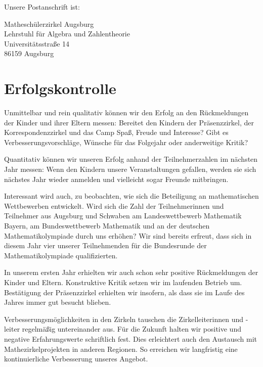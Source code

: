 \documentclass[12pt]{zettel}
\begin{document}
Unsere Postanschrift ist:
\vspace{-0.5em}
\begin{tabbing}
  {\qquad} Matheschülerzirkel Augsburg \\
  {\qquad} Lehrstuhl für Algebra und Zahlentheorie \\
  {\qquad} Universitätsstraße 14 \\
  {\qquad} 86159 Augsburg
\end{tabbing}


\section{Erfolgskontrolle}

Unmittelbar und rein qualitativ können wir den Erfolg an den Rückmeldungen der
Kinder und ihrer Eltern messen: Bereitet den Kindern der Präsenzzirkel, der
Korrespondenzzirkel und das Camp Spaß, Freude und Interesse? Gibt es
Verbesserungsvorschläge, Wünsche für das Folgejahr oder anderweitige Kritik?

Quantitativ können wir unseren Erfolg anhand der Teilnehmerzahlen im nächsten
Jahr messen: Wenn den Kindern unsere Veranstaltungen gefallen, werden sie sich
nächstes Jahr wieder anmelden und vielleicht sogar Freunde mitbringen.

Interessant wird auch, zu beobachten, wie sich die Beteiligung an
mathematischen Wettbewerben entwickelt. Wird sich die Zahl der
Teilnehmerinnen und Teilnehmer aus Augsburg und Schwaben am Landeswettbewerb
Mathematik Bayern, am Bundeswettbewerb Mathematik und an der deutschen
Mathematikolympiade durch uns erhöhen? Wir sind bereits erfreut,
dass sich in diesem Jahr vier unserer Teilnehmenden für die
Bundesrunde der Mathematikolympiade qualifizierten.

In unserem ersten Jahr erhielten wir auch schon sehr positive Rückmeldungen der
Kinder und Eltern. Konstruktive Kritik setzen wir im laufenden Betrieb um. Bestätigung der Präsenzzirkel erhielten wir insofern, als dass sie im Laufe des Jahres immer gut besucht blieben.

Verbesserungsmöglichkeiten in den Zirkeln tauschen die Zirkelleiterinnen und -leiter regelmäßig untereinander aus. Für die Zukunft halten wir positive und negative Erfahrungswerte schriftlich fest. Dies erleichtert auch den Austausch mit Mathezirkelprojekten in anderen Regionen. So erreichen wir langfristig eine kontinuierliche Verbesserung unseres Angebot.
\end{document}
